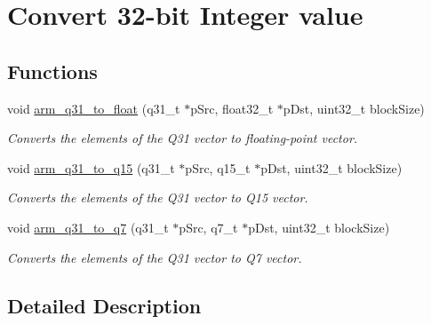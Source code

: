 \hypertarget{group__q31__to__x}{\section{Convert 32-\/bit Integer value}
\label{group__q31__to__x}
}
\subsection*{Functions}
\begin{DoxyCompactItemize}
\item 
void \hyperlink{group__q31__to__x_gacf407b007a37da18e99dabd9023c56b4}{arm\-\_\-q31\-\_\-to\-\_\-float} (q31\-\_\-t $\ast$p\-Src, float32\-\_\-t $\ast$p\-Dst, uint32\-\_\-t block\-Size)
\begin{DoxyCompactList}\small\item\em Converts the elements of the Q31 vector to floating-\/point vector. \end{DoxyCompactList}\item 
void \hyperlink{group__q31__to__x_ga901dede4661365c9e7c630d3eb31c32c}{arm\-\_\-q31\-\_\-to\-\_\-q15} (q31\-\_\-t $\ast$p\-Src, q15\-\_\-t $\ast$p\-Dst, uint32\-\_\-t block\-Size)
\begin{DoxyCompactList}\small\item\em Converts the elements of the Q31 vector to Q15 vector. \end{DoxyCompactList}\item 
void \hyperlink{group__q31__to__x_ga7f297d1a7d776805395095fdb24a8071}{arm\-\_\-q31\-\_\-to\-\_\-q7} (q31\-\_\-t $\ast$p\-Src, q7\-\_\-t $\ast$p\-Dst, uint32\-\_\-t block\-Size)
\begin{DoxyCompactList}\small\item\em Converts the elements of the Q31 vector to Q7 vector. \end{DoxyCompactList}\end{DoxyCompactItemize}


\subsection{Detailed Description}


